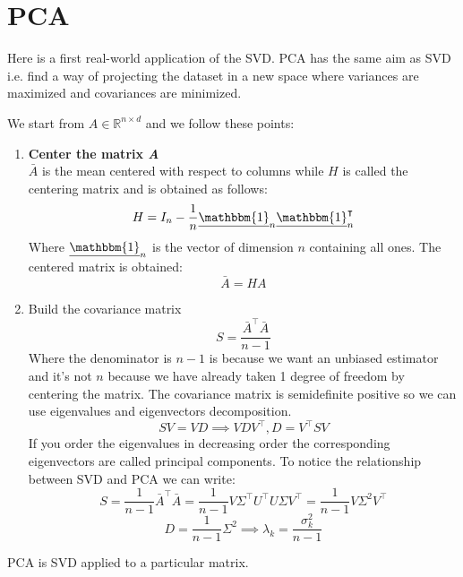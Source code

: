 \section{PCA}
Here is a first real-world application of the SVD. PCA has the same aim as SVD i.e. find a way of projecting the dataset in a new space where variances are maximized and covariances are minimized. 

We start from $A \in \mathbb{R}^{n \times d}$ and we follow these points:
\begin{enumerate}[i]
    \item \textbf{Center the matrix \emph{A}}\\
    $\bar{A}$ is the mean centered with respect to columns while $H$ is called the centering matrix and is obtained as follows:
    \[
        H = I_n - \dfrac{1}{n} \underline{\mathbbm{1}}_n \underline{\mathbbm{1}}_n^\intercal
    \]
    Where $\underline{\mathbbm{1}}_n$ is the vector of dimension $n$ containing all ones. The centered matrix is obtained:
    \[
        \bar{A} = HA    
    \]
    \item Build the covariance matrix
    \[
        S = \dfrac{\bar{A}^\intercal \bar{A}}{n - 1}     
    \]
    Where the denominator is $n-1$ is because we want an unbiased estimator and it's not $n$ because we have already taken 1 degree of freedom by centering the matrix. The covariance matrix is semidefinite positive so we can use eigenvalues and eigenvectors decomposition.
    \[
        SV = VD \implies VDV^\intercal, D = V^\intercal SV    
    \]
    If you order the eigenvalues in decreasing order the corresponding eigenvectors are called principal components. To notice the relationship between SVD and PCA we can write:
    \[
        S = \dfrac{1}{n-1}\bar{A}^\intercal \bar{A} = \dfrac{1}{n-1} V\Sigma^\intercal U^\intercal U \Sigma V^\intercal = \dfrac{1}{n-1} V \Sigma^2 V^\intercal    
    \]
    \[
        D = \dfrac{1}{n-1}\Sigma^2 \implies \lambda_k =\dfrac{\sigma_k^2}{n-1}    
    \]
\end{enumerate}
PCA is SVD applied to a particular matrix.


